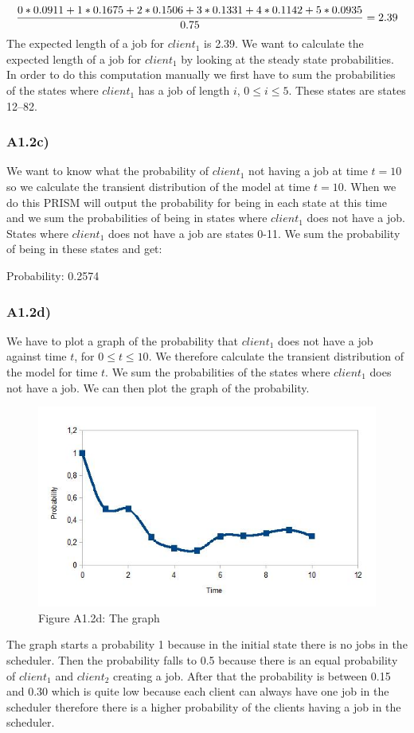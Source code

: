 \documentclass[12pt]{report}
\begin{document}
$$\frac{0 * 0.0911 + 1 * 0.1675 + 2 * 0.1506\\+ 3 * 0.1331 + 4 * 0.1142 + 5 * 0.0935}{0.75} = 2.39$$
The expected length of a job for $client_1$ is 2.39.
We want to calculate the expected length of a job for $client_1$ by looking at the steady state probabilities. In order to do this computation manually we first have to sum the probabilities of the states where $client_1$ has a job of length $i$, $0 \leq i \leq 5$. These states are states 12--82.

\subsubsection*{A1.2c)}
We want to know what the probability of $client_1$ not having a job at time $t = 10$ so we calculate the transient distribution of the model at time $t = 10$. When we do this PRISM will output the probability for being in each state at this time and we sum the probabilities of being in states where $client_1$ does not have a job. States where $client_1$ does not have a job are states 0-11. We sum the probability of being in these states and get:
\begin{center}
Probability: 0.2574
\end{center}

\subsubsection*{A1.2d)}
We have to plot a graph of the probability that $client_1$ does not have a job against time $t$, for $0 \leq t \leq 10$. We therefore calculate the transient distribution of the model for time $t$. We sum the probabilities of the states where $client_1$ does not have a job. We can then plot the graph of the probability.\\
\begin{figure}[H]
	\centering
	\includegraphics[scale=0.9]{../GFX/A1-2d.png}\\
	Figure A1.2d: The graph
\end{figure}
The graph starts a probability 1 because in the initial state there is no jobs in the scheduler. Then the probability falls to 0.5 because there is an equal probability of $client_1$ and $client_2$ creating a job. After that the probability is between 0.15 and 0.30 which is quite low because each client can always have one job in the scheduler therefore there is a higher probability of the clients having a job in the scheduler.
\end{document}
